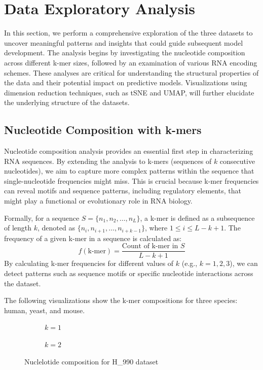 \section{Data Exploratory Analysis}\label{sec:data-exploratory-analysis}
  In this section, we perform a comprehensive exploration of the three datasets to uncover meaningful patterns and insights that could guide subsequent model development.
  The analysis begins by investigating the nucleotide composition across different k-mer sizes, followed by an examination of various RNA encoding schemes.
  These analyses are critical for understanding the structural properties of the data and their potential impact on predictive models.
  Visualizations using dimension reduction techniques, such as tSNE and UMAP, will further elucidate the underlying structure of the datasets.

  \subsection{Nucleotide Composition with k-mers}\label{subsec:nucleotide-composition-kmers}
    Nucleotide composition analysis provides an essential first step in characterizing RNA sequences.
    By extending the analysis to k-mers (sequences of $k$ consecutive nucleotides), we aim to capture more complex patterns within the sequence that single-nucleotide frequencies might miss.
    This is crucial because k-mer frequencies can reveal motifs and sequence patterns, including regulatory elements, that might play a functional or evolutionary role in RNA biology.

    Formally, for a sequence $S = \{n_1, n_2, \dots, n_L\}$, a k-mer is defined as a subsequence of length $k$, denoted as $\{n_i, n_{i+1}, \dots, n_{i+k-1}\}$, where $1 \leq i \leq L - k + 1$.
    The frequency of a given k-mer in a sequence is calculated as:
    \[
      f(\text{k-mer}) = \frac{\text{Count of k-mer in } S}{L - k + 1}
    \]
    By calculating k-mer frequencies for different values of $k$ (e.g., $k = 1, 2, 3$), we can detect patterns such as sequence motifs or specific nucleotide interactions across the dataset.

    The following visualizations show the k-mer compositions for three species: human, yeast, and mouse.

    \begin{figure}[H]
      \centering
      \begin{subfigure}{0.47\textwidth}
        \centering
        \resizebox{\textwidth}{!}{}
        \captionsetup{justification=centering}
        \caption{$k = 1$}
      \end{subfigure}%
      \hspace{0.05\textwidth}
      \begin{subfigure}{0.47\textwidth}
        \centering
        \resizebox{\textwidth}{!}{}
        \captionsetup{justification=centering}
        \caption{$k = 2$}
      \end{subfigure}%
      \caption{Nuclelotide composition for H\_990 dataset}\label{fig:nc_h_990}
    \end{figure}

